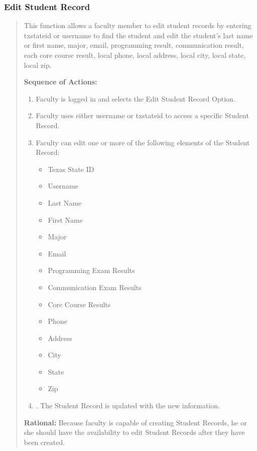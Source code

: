    \subsubsection{Edit Student Record}
   \begin{quote} %
         This function allows a faculty member to edit student records by
         entering txstateid or username to find the student and edit the
         student's last name or first name, major, email, programming result,
         communication result, each core course result, local phone, local
         address, local city, local state, local zip.
         
         \textbf{Sequence of Actions:}
         \begin{enumerate}
            \item Faculty is logged in and selects the Edit Student Record Option.
            \item Faculty uses either username or txstateid to access a specific
               Student Record.
            \item Faculty can edit one or more of the following elements of the
               Student Record:
               \begin{itemize}
                  \item Texas State ID
                  \item Username
                  \item Last Name
                  \item First Name
                  \item Major
                  \item Email
                  \item Programming Exam Results
                  \item Communication Exam Results
                  \item Core Course Results
                  \item Phone
                  \item Address
                  \item City
                  \item State
                  \item Zip
               \end{itemize}
            \item. The Student Record is updated with the new information.
      \end{enumerate}

         \textbf{Rational:}
         Because faculty is capable of creating Student Records, he or she
         should have the availability to edit Student Records after they have
         been created.
   \end{quote} %

